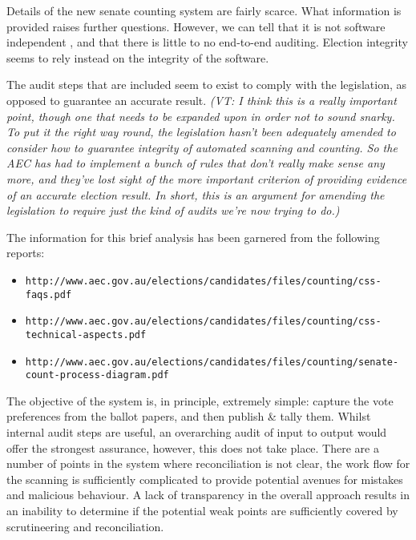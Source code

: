 \documentclass[10pt,a4paper]{article}
\newcommand{\VTNote}[1]{{\it(VT: #1)}}
\begin{document}
Details of the new senate counting system are fairly scarce. What information is provided raises further questions. However, we can tell that it is not software independent \cite{rivest08:e-vote}, and that there is little to no end-to-end auditing.  Election integrity seems to rely instead on the integrity of the software. 

The audit steps that are included seem to exist to comply with the legislation, as opposed to guarantee an accurate result.  \VTNote{I think this is a really important point, though one that needs to be expanded upon in order not to sound snarky.  To put it the right way round, the legislation hasn't been adequately amended to consider how to guarantee integrity of automated scanning and counting.  So the AEC has had to implement a bunch of rules that don't really make sense any more, and they've lost sight of the more important criterion of providing evidence of an accurate election result.  In short, this is an argument for amending the legislation to require just the kind of audits we're now trying to do.}

The information for this brief analysis has been garnered from the following reports:
\begin{itemize}
\item {\tt	http://www.aec.gov.au/elections/candidates/files/counting/css-faqs.pdf}
\item {\tt	http://www.aec.gov.au/elections/candidates/files/counting/css-technical-aspects.pdf}
\item {\tt	http://www.aec.gov.au/elections/candidates/files/counting/senate-count-process-diagram.pdf}
\end{itemize}

The objective of the system is, in principle, extremely simple: capture the vote preferences from the ballot papers, and then publish \& tally them. Whilst internal audit steps are useful, an overarching audit of input to output would offer the strongest assurance, however, this does not take place. There are a number of points in the system where reconciliation is not clear, the work flow for the scanning is sufficiently complicated to provide potential avenues for mistakes and malicious behaviour. A lack of transparency in the overall approach results in an inability to determine if the potential weak points are sufficiently covered by scrutineering and reconciliation. 
\end{document}
